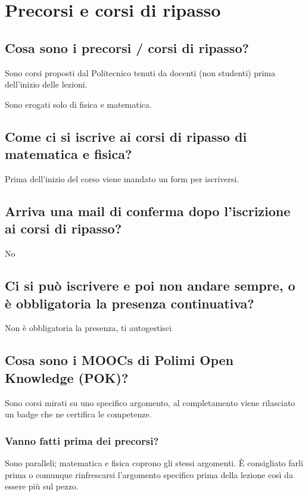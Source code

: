 \documentclass[legal]{polinetwork}
\begin{document}
\section{Precorsi e corsi di ripasso}


\subsection{Cosa sono i precorsi / corsi di ripasso?}


Sono corsi proposti dal Politecnico tenuti da docenti (non studenti) prima dell'inizio delle lezioni.

Sono erogati solo di fisica e matematica.

\subsection{Come ci si iscrive ai corsi di ripasso di matematica e fisica?}


Prima dell'inizio del corso viene mandato un form per iscriversi.

\subsection{Arriva una mail di conferma dopo l'iscrizione ai corsi di ripasso?}


No

\subsection{Ci si può iscrivere e poi non andare sempre, o è obbligatoria la presenza continuativa?}


Non è obbligatoria la presenza, ti autogestisci

\subsection{Cosa sono i MOOCs di Polimi Open Knowledge (POK)?}


Sono corsi mirati su uno specifico argomento, al completamento viene rilasciato un badge che ne certifica le competenze.

\subsubsection{Vanno fatti prima dei precorsi?}


Sono paralleli; matematica e fisica coprono gli stessi argomenti.
È consigliato farli prima o comunque rinfrescarsi l'argomento specifico prima della lezione così da essere più sul pezzo.
\end{document}
